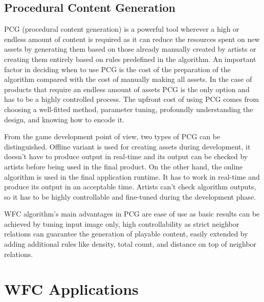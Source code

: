 \documentclass[shortabstract, english, inz]{iithesis}
\begin{document}
\section{Procedural Content Generation}
PCG (procedural content generation) is a powerful tool wherever a high or endless amount of content is required as it can reduce the resources spent on new assets by generating them based on those already manually created by artists or creating them entirely based on rules predefined in the algorithm. An important factor in deciding when to use PCG is the cost of the preparation of the algorithm compared with the cost of manually making all assets. In the case of products that require an endless amount of assets PCG is the only option and has to be a highly controlled process. The upfront cost of using PCG comes from choosing a well-fitted method, parameter tuning, profoundly understanding the design, and knowing how to encode it.


From the game development point of view, two types of PCG can be distinguished. Offline variant is used for creating assets during development, it doesn't have to produce output in real-time and its output can be checked by artists before being used in the final product. On the other hand, the online algorithm is used in the final application runtime. It has to work in real-time and produce its output in an acceptable time. Artists can't check algorithm outputs, so it has to be highly controllable and fine-tuned during the development phase. \cite{DesignLevelConstraints}


WFC algorithm's main advantages in PCG are ease of use as basic results can be achieved by tuning input image only, high controllability as strict neighbor relations can guarantee the generation of playable content, easily extended by adding additional rules like density, total count, and distance on top of neighbor relations. \cite{Smith, DesignLevelConstraints}



\chapter{WFC Applications}
\label{chapter2}
\end{document}
